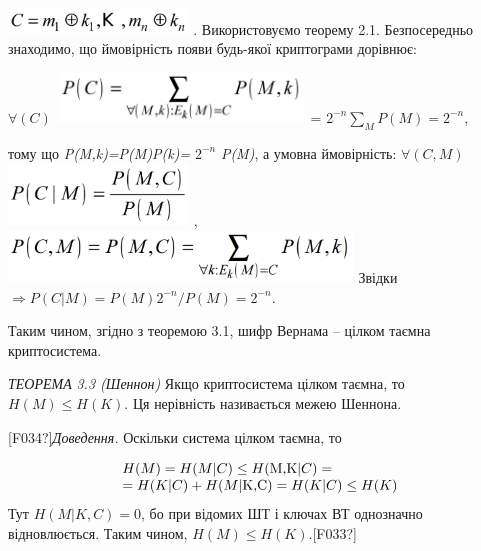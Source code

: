 \documentclass[a4paper]{article}
\newcounter{}
\newcommand\normalsubformula[1]{\text{\mathversion{normal}$#1$}}
\begin{document}
 \includegraphics[width=1.8819in,height=0.2791in]{crypt-img/crypt-img34.png} . 
Використовуємо теорему 2.1. Безпосередньо знаходимо, що ймовірність появи
будь-якої криптограми дорівнює:

{\centering
 ${\forall (C)}$  
\includegraphics[width=2.5984in,height=0.5189in]{crypt-img/crypt-img35.png} =
${2^{{-n}}\underset{{M}}{\sum }{P(M)}=2^{{-n}}}$,
\par}

{\centering
тому що
\textit{P}\textit{(}\textit{M}\textit{,}\textit{k}\textit{)=}\textit{P}\textit{(}\textit{M}\textit{)}\textit{P}\textit{(}\textit{k}\textit{)=}
${2^{{-n}}}$ \textit{P}\textit{(}\textit{M}\textit{)},  а  умовна ймовірність: 
${\forall (C,M)}$  
\includegraphics[width=1.8862in,height=0.661in]{crypt-img/crypt-img36.png} ,  
\includegraphics[width=3.602in,height=0.539in]{crypt-img/crypt-img37.png} 
Звідки  ${\Rightarrow P(C|M)=P(M)2^{{-n}}/P(M)=2^{{-n}}}$. 
\par}

Таким чином, згідно з теоремою 3.1, шифр Вернама – цілком таємна криптосистема.


\bigskip

\textit{ТЕОРЕМА }\textit{3}\textit{.3 (Шеннон)} Якщо криптосистема цілком
таємна, то  ${H(M)\le H(K)}$. Ця нерівність називається межею Шеннона.

\textlatin{[F034?]}\textit{Доведення.} Оскільки система цілком таємна, то 

\begin{equation*}
\begin{matrix}{H(M)=H(M|C)\le H(\normalsubformula{\text{M,K}}|C)=}\hfill\null
\\{=H(K|C)+H(M|\normalsubformula{\text{K,C}})=H(K|C)\le H({K})}\hfill\null
\end{matrix}\hfill 
\end{equation*}
Тут   ${H(M|K,C)=0}$, бо при відомих ШТ і  ключах ВТ однозначно відновлюється. 
Таким чином,   ${H(M)\le H(K)}$.\textlatin{[F033?]}
\end{document}
